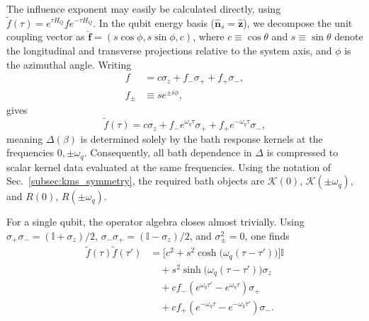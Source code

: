The influence exponent may easily be calculated directly, using $\tilde f(\tau)=e^{\tau H_Q} f e^{-\tau H_Q}$. In the qubit energy basis ($\hat{\mathbf{n}}_s = \hat{\mathbf{z}}$), we decompose the unit coupling vector as $\hat{\mathbf{f}} = (s \cos\phi, s \sin\phi, c)$, where $c \equiv \cos\theta$ and $s \equiv \sin\theta$ denote the longitudinal and transverse projections relative to the system axis, and $\phi$ is the azimuthal angle. Writing
\begin{equation}
\begin{split}
    f &= c\sigma_z + f_-\sigma_+ + f_+\sigma_-, \\
    f_\pm &\equiv s e^{\pm i \phi},
\end{split}
\end{equation}
gives
\begin{equation}
    \tilde f(\tau)=c\sigma_z+f_-e^{\omega_q\tau}\sigma_+ + f_+e^{-\omega_q\tau}\sigma_-,
\end{equation}
meaning $\Delta(\beta)$ is determined solely by the bath response kernels at the frequencies $0,\pm\omega_q$. Consequently,
all bath dependence in $\Delta$ is compressed to scalar kernel data evaluated
at the same frequencies. Using the notation of
Sec.~\ref{subsec:kms_symmetry}, the required bath objects are
$\mathcal{K}(0)$, $\mathcal{K}(\pm\omega_q)$, and $R(0)$,
$R(\pm\omega_q)$. 

For a single qubit, the operator algebra closes almost trivially. Using $\sigma_+\sigma_-=(\mathbb
I+\sigma_z)/2$, $\sigma_-\sigma_+=(\mathbb I-\sigma_z)/2$, and
$\sigma_\pm^2=0$, one finds
\begin{equation}
\begin{aligned}
    \tilde{f}(\tau)\tilde{f}(\tau')
    &= \Big[c^2 + s^2\cosh\big(\omega_q(\tau-\tau')\big)\Big]\mathbb{I} \\
    &\quad + s^2\sinh\big(\omega_q(\tau-\tau')\big)\sigma_z \\
    &\quad + c f_- \left(e^{\omega_q\tau'} - e^{\omega_q\tau}\right)\sigma_+ \\
    &\quad + c f_+ \left(e^{-\omega_q\tau} - e^{-\omega_q\tau'}\right)\sigma_- .
\end{aligned}
\end{equation}

